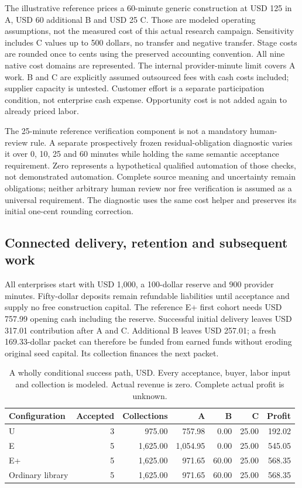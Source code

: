 The illustrative reference prices a 60-minute generic construction at USD 125 in A, USD 60 additional B and USD 25 C. Those are modeled operating assumptions, not the measured cost of this actual research campaign. Sensitivity includes C values up to 500 dollars, no transfer and negative transfer. Stage costs are rounded once to cents using the preserved accounting convention. All nine native cost domains are represented. The internal provider-minute limit covers A work. B and C are explicitly assumed outsourced fees with cash costs included; supplier capacity is untested. Customer effort is a separate participation condition, not enterprise cash expense. Opportunity cost is not added again to already priced labor.

The 25-minute reference verification component is not a mandatory human-review rule. A separate prospectively frozen residual-obligation diagnostic varies it over 0, 10, 25 and 60 minutes while holding the same semantic acceptance requirement. Zero represents a hypothetical qualified automation of those checks, not demonstrated automation. Complete source meaning and uncertainty remain obligations; neither arbitrary human review nor free verification is assumed as a universal requirement. The diagnostic uses the same cost helper and preserves its initial one-cent rounding correction.

\subsection{Connected delivery, retention and subsequent work}

All enterprises start with USD 1,000, a 100-dollar reserve and 900 provider minutes. Fifty-dollar deposits remain refundable liabilities until acceptance and supply no free construction capital. The reference E+ first cohort needs USD 757.99 opening cash including the reserve. Successful initial delivery leaves USD 317.01 contribution after A and C. Additional B leaves USD 257.01; a fresh 169.33-dollar packet can therefore be funded from earned funds without eroding original seed capital. Its collection finances the next packet.

\begin{table}[htbp]\centering\small
\begin{tabularx}{\textwidth}{lrrrrrr}
\toprule Configuration & Accepted & Collections & A & B & C & Profit\\\midrule
U &3 &975.00 &757.98 &0.00 &25.00 &192.02\\
E &5 &1,625.00 &1,054.95 &0.00 &25.00 &545.05\\
E+ &5 &1,625.00 &971.65 &60.00 &25.00 &568.35\\
Ordinary library &5 &1,625.00 &971.65 &60.00 &25.00 &568.35\\\bottomrule
\end{tabularx}
\caption{A wholly conditional success path, USD. Every acceptance, buyer, labor input and collection is modeled. Actual revenue is zero. Complete actual profit is unknown.}
\end{table}


